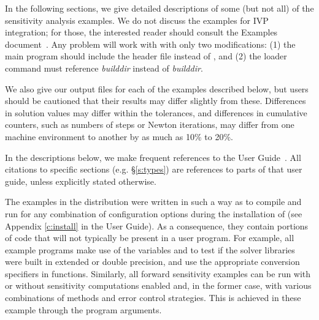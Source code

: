 
\vspace{0.2in}\noindent
In the following sections, we give detailed descriptions of some (but
not all) of the sensitivity analysis examples. We do not discuss the 
examples for IVP integration; for those, the interested reader should consult
the {\ida} Examples document~\cite{ida_ex}. Any {\ida} problem
will work with {\idas} with only two modifications: (1) the main program
should include the header file  instead of , and
(2) the loader command must reference
{\em builddir} instead of
{\em builddir}.

We also give our output files for each of the examples described below,
but users should be cautioned that their results may differ slightly from these.
Differences in solution values may differ within the tolerances, and differences
in cumulative counters, such as numbers of steps or Newton iterations, may differ
from one machine environment to another by as much as 10\% to 20\%.

In the descriptions below, we make frequent references to the {\idas}
User Guide~\cite{idas_ug}.  All citations to specific sections
(e.g. \S\ref{s:types}) are references to parts of that user guide, unless
explicitly stated otherwise.

\vspace{0.2in}
The examples in the {\idas} distribution were written in such a way as
to compile and run for any combination of configuration options during
the installation of {\sundials} (see Appendix \ref{c:install} in the User Guide).
As a consequence, they contain portions of code that will not typically be present in a
user program. For example, all example programs make use of the
variables  and 
to test if the solver libraries
were built in extended or double precision, and use the appropriate conversion 
specifiers in  functions. Similarly, all forward sensitivity
examples can be run with or without sensitivity computations enabled and,
in the former case, with various combinations of methods and error control 
strategies. This is achieved in these example through the program arguments.
